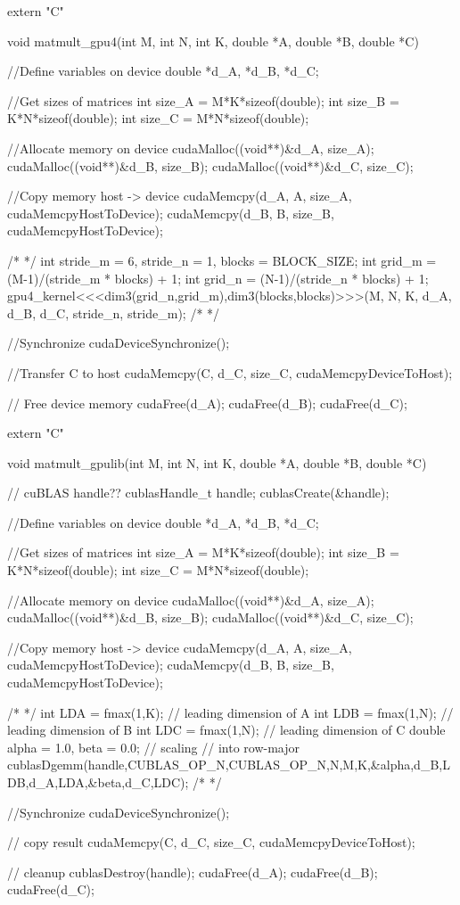 extern "C" { 
void matmult_gpu4(int M, int N, int K, double *A, double *B, double *C) { 

    //Define variables on device
    double *d_A, *d_B, *d_C;

    //Get sizes of matrices
    int size_A = M*K*sizeof(double);
    int size_B = K*N*sizeof(double);
    int size_C = M*N*sizeof(double);

    //Allocate memory on device
    cudaMalloc((void**)&d_A, size_A);
    cudaMalloc((void**)&d_B, size_B);
    cudaMalloc((void**)&d_C, size_C);

    //Copy memory host -> device
    cudaMemcpy(d_A, A, size_A, cudaMemcpyHostToDevice);
    cudaMemcpy(d_B, B, size_B, cudaMemcpyHostToDevice); 

    /* */
    int stride_m = 6, stride_n = 1, blocks = BLOCK_SIZE;
    int grid_m = (M-1)/(stride_m * blocks) + 1;
    int grid_n = (N-1)/(stride_n * blocks) + 1;
    gpu4_kernel<<<dim3(grid_n,grid_m),dim3(blocks,blocks)>>>(M, N, K, d_A, d_B, d_C, stride_n, stride_m);
    /* */
    
    //Synchronize
    cudaDeviceSynchronize(); 
    
    //Transfer C to host
    cudaMemcpy(C, d_C, size_C, cudaMemcpyDeviceToHost);

    // Free device memory
    cudaFree(d_A);
    cudaFree(d_B);
    cudaFree(d_C);
}
}



extern "C" { 
void matmult_gpulib(int M, int N, int K, double *A, double *B, double *C) {

    // cuBLAS handle??
    cublasHandle_t handle;
    cublasCreate(&handle);

    //Define variables on device
    double *d_A, *d_B, *d_C;

    //Get sizes of matrices
    int size_A = M*K*sizeof(double);
    int size_B = K*N*sizeof(double);
    int size_C = M*N*sizeof(double);

    //Allocate memory on device
    cudaMalloc((void**)&d_A, size_A);
    cudaMalloc((void**)&d_B, size_B);
    cudaMalloc((void**)&d_C, size_C);

    //Copy memory host -> device
    cudaMemcpy(d_A, A, size_A, cudaMemcpyHostToDevice);
    cudaMemcpy(d_B, B, size_B, cudaMemcpyHostToDevice);
    
    /* */
    int LDA = fmax(1,K); // leading dimension of A
    int LDB = fmax(1,N); // leading dimension of B
    int LDC = fmax(1,N); // leading dimension of C
    double alpha = 1.0, beta = 0.0; // scaling
    // into row-major
    cublasDgemm(handle,CUBLAS_OP_N,CUBLAS_OP_N,N,M,K,&alpha,d_B,LDB,d_A,LDA,&beta,d_C,LDC);
    /* */
    
    //Synchronize
    cudaDeviceSynchronize(); 
 
    // copy result
    cudaMemcpy(C, d_C, size_C, cudaMemcpyDeviceToHost);
    
    // cleanup
    cublasDestroy(handle);
    cudaFree(d_A);
    cudaFree(d_B); 
    cudaFree(d_C);
}
}


